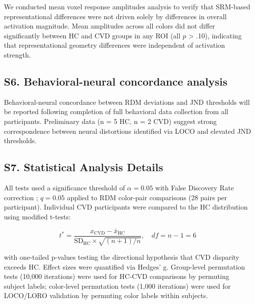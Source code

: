 We conducted mean voxel response amplitudes analysis to verify that SRM-based representational differences were not driven solely by differences in overall activation magnitude. Mean amplitudes across all colors did not differ significantly between HC and CVD groups in any ROI (all $p$ > .10), indicating that representational geometry differences were independent of activation strength.

\subsection*{S6. Behavioral-neural concordance analysis}

Behavioral-neural concordance between RDM deviations and JND thresholds will be reported following completion of full behavioral data collection from all participants. Preliminary data (n = 5 HC, n = 2 CVD) suggest strong correspondence between neural distortions identified via LOCO and elevated JND thresholds.

\subsection*{S7. Statistical Analysis Details}

All tests used a significance threshold of $\alpha = 0.05$ with False Discovery Rate correction \cite{benjamini1995}; $q = 0.05$ applied to RDM color-pair comparisons (28 pairs per participant). Individual CVD participants were compared to the HC distribution using \textcite{crawford1998} modified t-tests:

\begin{equation}
t^* = \frac{x_{\text{CVD}} - \bar{x}_{\text{HC}}}{\text{SD}_{\text{HC}} \times \sqrt{(n+1)/n}}, \quad df = n-1 = 6
\end{equation}

with one-tailed p-values testing the directional hypothesis that CVD disparity exceeds HC. Effect sizes were quantified via Hedges' g. Group-level permutation tests (10,000 iterations) were used for HC-CVD comparisons by permuting subject labels; color-level permutation tests (1,000 iterations) were used for LOCO/LORO validation by permuting color labels within subjects.
